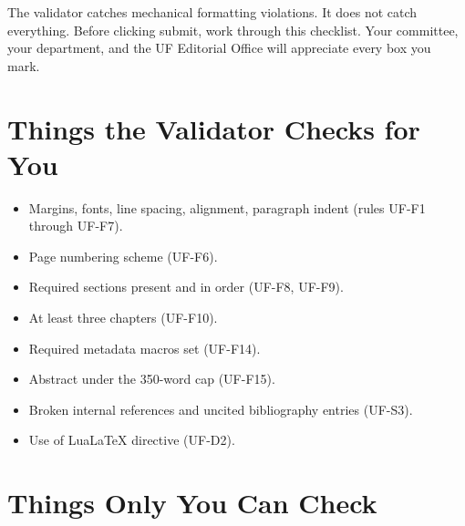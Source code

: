 The validator catches mechanical formatting violations. It does not
catch everything. Before clicking submit, work through this checklist.
Your committee, your department, and the UF Editorial Office will
appreciate every box you mark.

\section{Things the Validator Checks for You}

\begin{itemize}
    \item Margins, fonts, line spacing, alignment, paragraph indent
          (rules UF-F1 through UF-F7).
    \item Page numbering scheme (UF-F6).
    \item Required sections present and in order (UF-F8, UF-F9).
    \item At least three chapters (UF-F10).
    \item Required metadata macros set (UF-F14).
    \item Abstract under the 350-word cap (UF-F15).
    \item Broken internal references and uncited bibliography entries
          (UF-S3).
    \item Use of LuaLaTeX directive (UF-D2).
\end{itemize}

\section{Things Only You Can Check}

